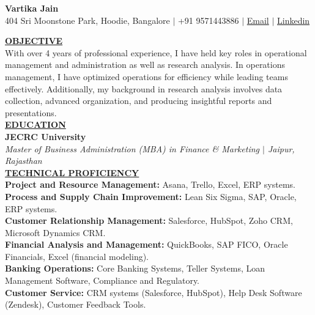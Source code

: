 \documentclass{article}
\begin{document}
\begin{center}
\thispagestyle{empty}
\large \textbf{Vartika Jain \\}
\normalsize404 Sri Moonstone Park, Hoodie, Bangalore $\mid$ +91 9571443886 $\mid$ \href{mailto:vartikajainvps@gmail.com }{Email}  $\mid$ \href{www.linkedin.com/in/vartikajai/}{Linkedin} \\
\hrulefill
\end{center}


\noindent \textbf{\underline{OBJECTIVE}} \\
With over 4 years of professional experience, I have held key roles in operational management and 
administration as well as research analysis. In operations management, I have optimized operations for 
efficiency while leading teams effectively. Additionally, my background in research analysis involves data 
collection, advanced organization, and producing insightful reports and presentations.\\


\noindent \textbf{\underline{EDUCATION}} \\
\textbf{JECRC University}  \\
\textit{Master of Business Administration (MBA) in Finance \& Marketing $\mid$ Jaipur, Rajasthan}   \\


\noindent \textbf{\underline{TECHNICAL PROFICIENCY}} \\
\noindent \textbf{Project and Resource Management:} Asana, Trello, Excel, ERP systems.\\
\noindent \textbf{Process and Supply Chain Improvement:} Lean Six Sigma, SAP, Oracle, ERP systems.\\
\noindent \textbf{Customer Relationship Management:} Salesforce, HubSpot, Zoho CRM, Microsoft Dynamics CRM.\\
\noindent \textbf{Financial Analysis and Management:} QuickBooks, SAP FICO, Oracle Financials, Excel (financial modeling).\\
\noindent \textbf{Banking Operations:} Core Banking Systems, Teller Systems, Loan Management Software, Compliance and Regulatory.\\
\noindent \textbf{Customer Service:} CRM systems (Salesforce, HubSpot), Help Desk Software (Zendesk), Customer Feedback Tools.\\
\end{document}
